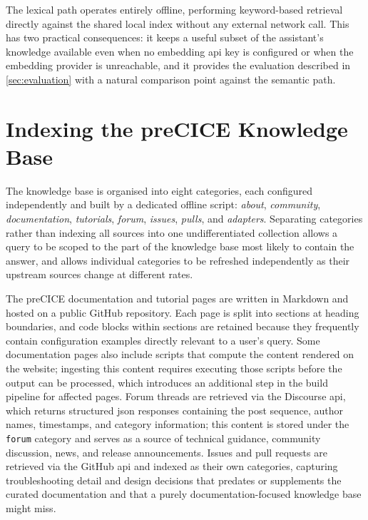 \documentclass[
  numbers=noenddot,
  english,
  a4paper,
  twoside,
  bibliography=totoc,
  headsepline,
  cleardoublepage=empty,
  parskip=half,
  draft=false
]{scrbook}
\theoremstyle{break}
\renewcommand{\_}{\textunderscore\allowbreak}
\begin{document}
The lexical path operates entirely offline, performing keyword-based retrieval directly
against the shared local index without any external network call. This has two practical
consequences: it keeps a useful subset of the assistant's knowledge available even when no
embedding \gls{api} key is configured or when the embedding provider is unreachable, and it
provides the evaluation described in \cref{sec:evaluation} with a natural comparison point
against the semantic path.


\section{Indexing the preCICE Knowledge Base}\label{sec:context-retrieval:indexing}

The knowledge base is organised into eight categories, each configured independently and
built by a dedicated offline script: \emph{about}, \emph{community}, \emph{documentation},
\emph{tutorials}, \emph{forum}, \emph{issues}, \emph{pulls}, and \emph{adapters}. Separating categories rather
than indexing all sources into one undifferentiated collection allows a query to be scoped to
the part of the knowledge base most likely to contain the answer, and allows individual
categories to be refreshed independently as their upstream sources change at different rates.

The preCICE documentation and tutorial pages are written in Markdown and hosted on a public
GitHub repository. Each page is split into sections at heading boundaries, and code blocks
within sections are retained because they frequently contain configuration examples directly
relevant to a user's query. Some documentation pages also include scripts that compute the
content rendered on the website; ingesting this content requires executing those scripts
before the output can be processed, which introduces an additional step in the build pipeline
for affected pages. Forum threads are retrieved via the Discourse \gls{api}, which returns
structured \gls{json} responses containing the post sequence, author names, timestamps, and
category information; this content is stored under the \texttt{forum} category and serves as
a source of technical guidance, community discussion, news, and release announcements. Issues
and pull requests are retrieved via the GitHub \gls{api} and indexed as their own categories,
capturing troubleshooting detail and design decisions that predates or supplements the curated
documentation and that a purely documentation-focused knowledge base might miss.
\end{document}
